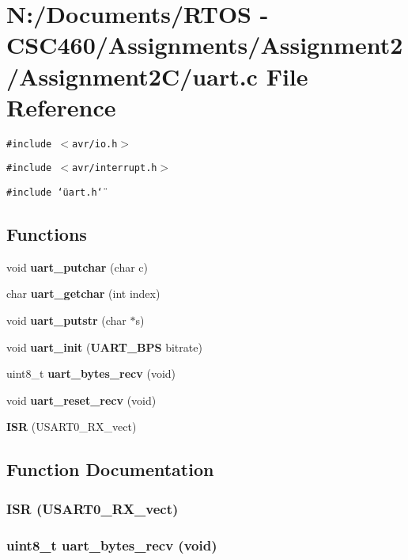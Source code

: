 \section{N:/Documents/RTOS - CSC460/Assignments/Assignment2/Assignment2C/uart.c File Reference}
\label{uart_8c}
{\tt \#include $<$avr/io.h$>$}\par
{\tt \#include $<$avr/interrupt.h$>$}\par
{\tt \#include \char`\"{}uart.h\char`\"{}}\par
\subsection*{Functions}
\begin{CompactItemize}
\item 
void {\bf uart\_\-putchar} (char c)
\item 
char {\bf uart\_\-getchar} (int index)
\item 
void {\bf uart\_\-putstr} (char $\ast$s)
\item 
void {\bf uart\_\-init} ({\bf UART\_\-BPS} bitrate)
\item 
uint8\_\-t {\bf uart\_\-bytes\_\-recv} (void)
\item 
void {\bf uart\_\-reset\_\-recv} (void)
\item 
{\bf ISR} (USART0\_\-RX\_\-vect)
\end{CompactItemize}


\subsection{Function Documentation}
\subsubsection{\setlength{\rightskip}{0pt plus 5cm}ISR (USART0\_\-RX\_\-vect)}\label{uart_8c_084f0a9cf05b1877bd8a71a90dae7ff8}


\subsubsection{\setlength{\rightskip}{0pt plus 5cm}uint8\_\-t uart\_\-bytes\_\-recv (void)}\label{uart_8c_139a5091a132106e37f250a0c5d75fe0}


